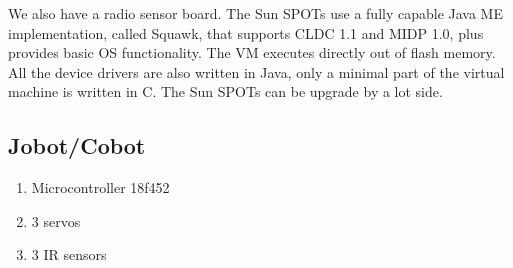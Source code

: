 \documentclass[a4paper,10pt]{article} %
\begin{document}
We also have a radio sensor board. The Sun SPOTs use a fully capable Java ME
implementation, called Squawk, that supports CLDC 1.1 and MIDP 1.0, plus
provides basic OS functionality. The VM executes directly out of flash memory.
All the device drivers are also written in Java, only a minimal part of the
virtual machine is written in C. The Sun SPOTs can be upgrade by a lot side.



\subsection{Jobot/Cobot} %
\label{app:cobot}

\begin{enumerate}
	\item Microcontroller 18f452
	\item 3 servos
	\item 3 IR sensors
\end{enumerate}





\end{document}

